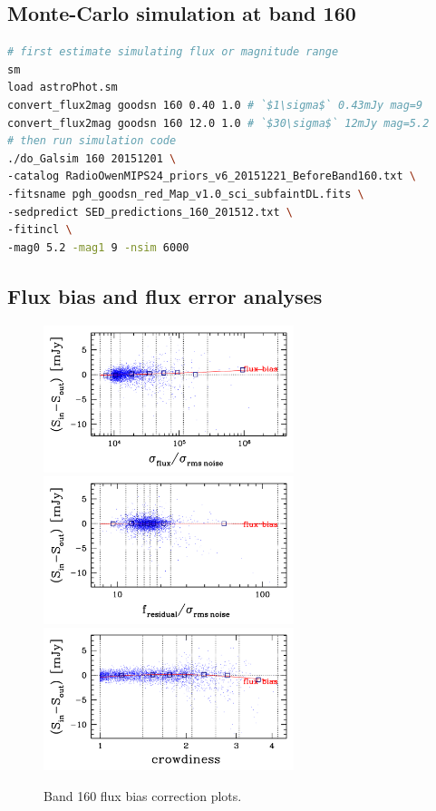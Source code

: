 \documentclass[11pt,a4paper]{article}
\begin{document}
\subsection{Monte-Carlo simulation at band 160}
\label{Band160_Galsim}

\begin{lstlisting}[language=bash]
# first estimate simulating flux or magnitude range
sm
load astroPhot.sm 
convert_flux2mag goodsn 160 0.40 1.0 # `$1\sigma$` 0.43mJy mag=9
convert_flux2mag goodsn 160 12.0 1.0 # `$30\sigma$` 12mJy mag=5.2
# then run simulation code
./do_Galsim 160 20151201 \
-catalog RadioOwenMIPS24_priors_v6_20151221_BeforeBand160.txt \
-fitsname pgh_goodsn_red_Map_v1.0_sci_subfaintDL.fits \
-sedpredict SED_predictions_160_201512.txt \
-fitincl \
-mag0 5.2 -mag1 9 -nsim 6000 
\end{lstlisting}

\subsection{Flux bias and flux error analyses}
\label{Band160_simanalyses}

\begin{figure}[H]
	\caption{
		Band 160 flux bias correction plots.
	}
	\includegraphics[width=0.65\textwidth]{galsim_160_fbias_1}
	\includegraphics[width=0.65\textwidth]{galsim_160_fbias_2}
	\includegraphics[width=0.65\textwidth]{galsim_160_fbias_3}
\end{figure}
\end{document}
